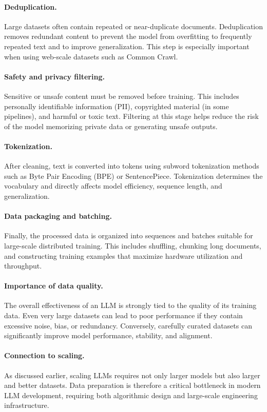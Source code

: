 \documentclass{article}
\begin{document}
\paragraph{Deduplication.}
Large datasets often contain repeated or near-duplicate documents. Deduplication removes redundant content to prevent the model from overfitting to frequently repeated text and to improve generalization. This step is especially important when using web-scale datasets such as Common Crawl.

\paragraph{Safety and privacy filtering.}
Sensitive or unsafe content must be removed before training. This includes personally identifiable information (PII), copyrighted material (in some pipelines), and harmful or toxic text. Filtering at this stage helps reduce the risk of the model memorizing private data or generating unsafe outputs.

\paragraph{Tokenization.}
After cleaning, text is converted into tokens using subword tokenization methods such as Byte Pair Encoding (BPE) or SentencePiece. Tokenization determines the vocabulary and directly affects model efficiency, sequence length, and generalization.

\paragraph{Data packaging and batching.}
Finally, the processed data is organized into sequences and batches suitable for large-scale distributed training. This includes shuffling, chunking long documents, and constructing training examples that maximize hardware utilization and throughput.

\paragraph{Importance of data quality.}
The overall effectiveness of an LLM is strongly tied to the quality of its training data. Even very large datasets can lead to poor performance if they contain excessive noise, bias, or redundancy. Conversely, carefully curated datasets can significantly improve model performance, stability, and alignment.

\paragraph{Connection to scaling.}
As discussed earlier, scaling LLMs requires not only larger models but also larger and better datasets. Data preparation is therefore a critical bottleneck in modern LLM development, requiring both algorithmic design and large-scale engineering infrastructure.
\end{document}
